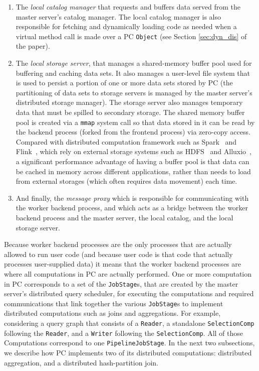\begin{enumerate}
\item The \emph{local catalog manager} that requests and 
buffers data served from the master server's catalog manager.  The local catalog manager is also responsible for fetching and dynamically loading
code as needed when a virtual method call is made over a PC \texttt{Object} (see Section \ref{sec:dyn_dis} of the paper).
\item The \emph{local storage server}, that manages a
  shared-memory buffer pool used for buffering and caching data sets.  It also manages
a  user-level file system that is used to persist a portion of one or more data sets stored by PC (the partitioning of data sets to storage servers is managed
by the master server's distributed storage manager).  The storage server also manages temporary data that must be spilled to secondary storage.
The shared memory buffer pool is created via a \texttt{mmap} system call so that
data stored in it can be read by the backend process (forked from
the frontend process) via zero-copy access. Compared with distributed
computation framework such as Spark~\cite{zaharia2010spark} and Flink~\cite{alexandrov2014stratosphere, carbone2015apache}, which rely on
external storage systems such as HDFS~\cite{borthakur2008hdfs} and Alluxio~\cite{li2014tachyon}, a significant
performance advantage of having a buffer pool is that data can be cached in memory
across different applications, rather than needs to load from external
storages (which often requires data movement) each time.
\item And finally, the \emph{message proxy} which is responsible for communicating with the worker backend process, and which acts as a bridge between the
worker backend process and the master server, the local catalog, and the local storage server.

\end{enumerate}

Because worker backend processes are the only processes that are actually allowed to run user code (and because user code is that code that actually processes
user-supplied data) it means that the worker backend processes are
where all computations in PC are actually performed.  One or more computation in PC corresponds 
to a set of the 
\texttt{JobStage}s, that are created by the master server's distributed query scheduler, 
for executing the computations and required communications
that link together the various \texttt{JobStage}s to implement distributed
computations such as joins and aggregations. 
For example, considering a query graph that consists of a \texttt{Reader}, a standalone \texttt{SelectionComp} following
the \texttt{Reader}, and a
\texttt{Writer} following the \texttt{SelectionComp}. All of those Computations correspond
to one \texttt{PipelineJobStage}. In the next two subsections, we
describe how PC implements two of its distributed computations:
distributed aggregation, and a distributed hash-partition join.


